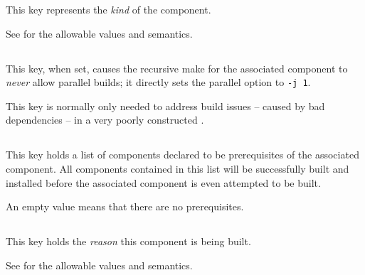 This key represents the \emph{kind} of the component.

See  for the allowable values and semantics.


\subsection{}\label{variables:no-parallel}

This key, when set, causes the recursive make for the associated
component to \emph{never} allow parallel builds; it directly sets the
\gnumake parallel option to \texttt{-j 1}.

This key is normally only needed to address build issues -- caused by
bad dependencies -- in a very poorly constructed \makefile.


\subsection{}\label{variables:prerequisite}

This key holds a list of components declared to be prerequisites of
the associated component.  All components contained in this list will
be successfully built and installed before the associated component is
even attempted to be built.

An empty value means that there are no prerequisites.


\subsection{}\label{variables:reason}

This key holds the \emph{reason} this component is being built.

See  for the allowable values and semantics.


\subsection{}\label{variables:source-directory}

